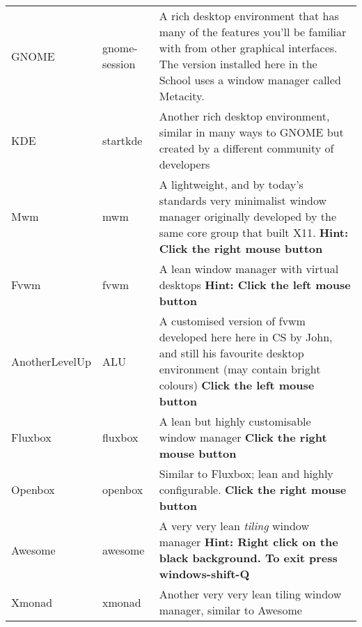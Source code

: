 \small
{


\begin{tabular}{l l p{10cm}}
GNOME & gnome-session & A rich desktop environment that has many of the features you'll be familiar with from other graphical interfaces. The version installed here in the School uses a window manager called Metacity. \\
KDE & startkde & Another rich desktop environment, similar in many ways to GNOME but created by a different community of developers \\
Mwm & mwm & A lightweight, and by today's standards very minimalist window manager originally developed by the same core group that built X11.  \textbf{Hint: Click the right mouse button} \\
Fvwm & fvwm & A lean window manager with virtual desktops \textbf{Hint: Click the left mouse button} \\
AnotherLevelUp & ALU & A customised version of fvwm developed here here in CS by John, and still his favourite desktop environment (may contain bright colours) \textbf{Click the left mouse button}\\
Fluxbox & fluxbox & A lean but highly customisable window manager \textbf{Click the right mouse button}\\
Openbox & openbox & Similar to Fluxbox; lean and highly configurable. \textbf{Click the right mouse button} \\
Awesome & awesome & A very very lean \textit{tiling} window manager \textbf{Hint: Right click on the black background. To exit press windows-shift-Q}\\
Xmonad & xmonad & Another very very lean tiling window manager, similar to Awesome  
\end{tabular}

}


